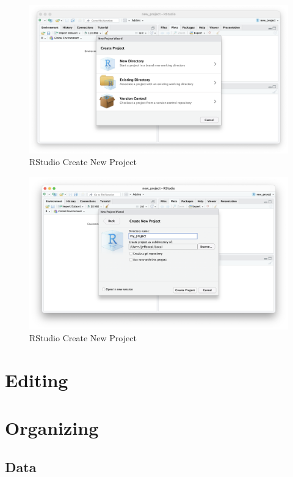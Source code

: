 \documentclass[
]{book}
\begin{document}
\begin{figure}
\includegraphics[width=30.72in]{images/03_021_new_project_01} \caption{\label{fig:3201}RStudio Create New Project}\label{fig:3201}
\end{figure}
\begin{figure}
\includegraphics[width=31.94in]{images/03_021_new_project_02} \caption{\label{fig:3202}RStudio Create New Project}\label{fig:3202}
\end{figure}

\hypertarget{editing}{%
\section{Editing}\label{editing}}

\hypertarget{organizing}{%
\section{Organizing}\label{organizing}}

\hypertarget{data}{%
\subsection{Data}\label{data}}
\end{document}
